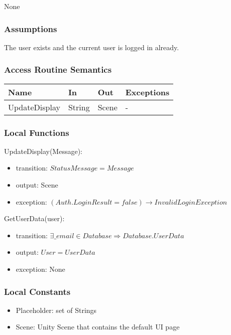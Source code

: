 \documentclass[12pt, titlepage]{article}
\begin{document}
None

\subsubsection{Assumptions}

The user exists and the current user is logged in already.

\subsubsection{Access Routine Semantics}

\begin{center}
	\begin{tabular}{p{4cm} p{2cm} p{4cm} p{4cm}}
	\hline
	\textbf{Name} & \textbf{In} & \textbf{Out} & \textbf{Exceptions} \\
	\hline
	UpdateDisplay & String & Scene & - \\
	\hline
	\end{tabular}
\end{center}

\subsubsection{Local Functions}

\noindent UpdateDisplay(Message):
\begin{itemize}
\item transition: $StatusMessage = Message$ 
\item output: Scene
\item exception: $(Auth.LoginResult = false) \rightarrow InvalidLoginException$
\end{itemize}

\noindent GetUserData(user):
\begin{itemize}
\item transition: $\exists \_email \in Database \Rightarrow Database.UserData$
\item output: $User = UserData$
\item exception: None
\end{itemize}

\subsubsection{Local Constants}

\begin{itemize}
	\item Placeholder: set of Strings
	\item Scene: Unity Scene that contains the default UI page
\end{itemize}
\end{document}
